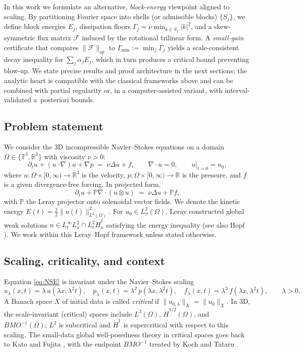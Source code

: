 \IfFileExists{nyjm.cls}{\documentclass[11pt]{nyjm}}{\documentclass[11pt]{amsart}}
\newcommand{\R}{\mathbb{R}}
\newcommand{\T}{\mathbb{T}}
\theoremstyle{plain}
\theoremstyle{definition}
\theoremstyle{remark}
\begin{document}
In this work we formulate an alternative, \emph{block-energy} viewpoint aligned to scaling. By partitioning Fourier space into shells (or admissible blocks) $\{S_j\}$, we define block energies $E_j$, dissipation floors $\Gamma_j=\nu\min_{k\in S_j}|k|^2$, and a skew-symmetric flux matrix $\mathcal F$ induced by the rotational trilinear form. A \emph{small-gain} certificate that compares $\|\mathcal F\|_{op}$ to $\Gamma_{\min}:=\min_j \Gamma_j$ yields a scale-consistent decay inequality for $\sum_j \alpha_j E_j$, which in turn produces a critical bound preventing blow-up. We state precise results and proof architecture in the next sections; the analytic heart is compatible with the classical frameworks above and can be combined with partial regularity or, in a computer-assisted variant, with interval-validated a~posteriori bounds.

\subsection{Problem statement}\label{subsec:problem}
We consider the 3D incompressible Navier--Stokes equations on a domain $\Omega\in\{\T^3,\R^3\}$ with viscosity $\nu>0$:
\begin{equation}\label{eq:NSE}
\partial_t u + (u\cdot\nabla)u + \nabla p \;=\; \nu \Delta u + f,\qquad \nabla\cdot u = 0,\qquad u|_{t=0}=u_0,
\end{equation}
where $u:\Omega\times[0,\infty)\to\R^3$ is the velocity, $p:\Omega\times[0,\infty)\to\R$ is the pressure, and $f$ is a given divergence-free forcing. In projected form,
\begin{equation}\label{eq:projected}
\partial_t u + \mathbb P\nabla\!\cdot(u\otimes u) \;=\; \nu \Delta u + \mathbb P f,
\end{equation}
with $\mathbb P$ the Leray projector onto solenoidal vector fields. We denote the kinetic energy $E(t)=\tfrac12\|u(t)\|_{L^2(\Omega)}^2$. For $u_0\in L^2_\sigma(\Omega)$, Leray constructed global weak solutions $u\in L^\infty_t L^2_x\cap L^2_t \dot H^1_x$ satisfying the energy inequality \cite{Leray1934} (see also Hopf \cite{Hopf1951}). We work within this Leray--Hopf framework unless stated otherwise.


\subsection{Scaling, criticality, and context}\label{subsec:scaling}
Equation \eqref{eq:NSE} is invariant under the Navier--Stokes scaling
\[
u_\lambda(x,t)=\lambda\,u(\lambda x,\lambda^2 t),\quad
p_\lambda(x,t)=\lambda^2\,p(\lambda x,\lambda^2 t),\quad
f_\lambda(x,t)=\lambda^3\,f(\lambda x,\lambda^2 t),\qquad \lambda>0.
\]
A Banach space $X$ of initial data is called \emph{critical} if $\|u_{0,\lambda}\|_X=\|u_0\|_X$. In 3D, the scale-invariant (critical) spaces include $L^3(\Omega)$, $\dot H^{1/2}(\Omega)$, and $BMO^{-1}(\Omega)$; $L^2$ is subcritical and $\dot H^1$ is supercritical with respect to this scaling. The small-data global well-posedness theory in critical spaces goes back to Kato and Fujita \cite{FujitaKato1964,Kato1984}, with the endpoint $BMO^{-1}$ treated by Koch and Tataru \cite{KochTataru2001}.
\end{document}
